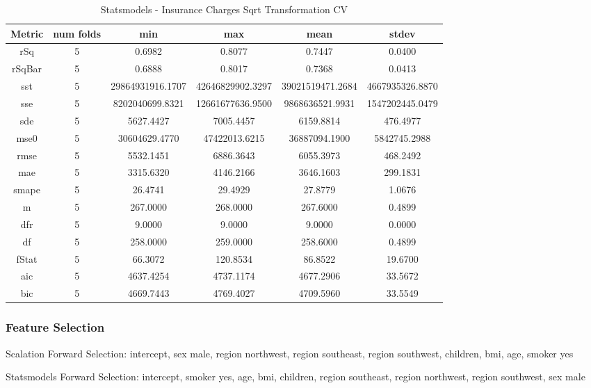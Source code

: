 \documentclass{article}
\begin{document}
\begin{table}[H]
\centering
\caption{Statsmodels - Insurance Charges Sqrt Transformation CV}
\label{tab:Statsmodels - Insurance Charges Sqrt Transformation CV}
\begin{tabular}{|c|c|c|c|c|c|}\hline
Metric & num folds & min & max & mean & stdev \\ \hline \hline
rSq & 5 & 0.6982 & 0.8077 & 0.7447 & 0.0400 \\ \hline
rSqBar & 5 & 0.6888 & 0.8017 & 0.7368 & 0.0413 \\ \hline
sst & 5 & 29864931916.1707 & 42646829902.3297 & 39021519471.2684 & 4667935326.8870 \\ \hline
sse & 5 & 8202040699.8321 & 12661677636.9500 & 9868636521.9931 & 1547202445.0479 \\ \hline
sde & 5 & 5627.4427 & 7005.4457 & 6159.8814 & 476.4977 \\ \hline
mse0 & 5 & 30604629.4770 & 47422013.6215 & 36887094.1900 & 5842745.2988 \\ \hline
rmse & 5 & 5532.1451 & 6886.3643 & 6055.3973 & 468.2492 \\ \hline
mae & 5 & 3315.6320 & 4146.2166 & 3646.1603 & 299.1831 \\ \hline
smape & 5 & 26.4741 & 29.4929 & 27.8779 & 1.0676 \\ \hline
m & 5 & 267.0000 & 268.0000 & 267.6000 & 0.4899 \\ \hline
dfr & 5 & 9.0000 & 9.0000 & 9.0000 & 0.0000 \\ \hline
df & 5 & 258.0000 & 259.0000 & 258.6000 & 0.4899 \\ \hline
fStat & 5 & 66.3072 & 120.8534 & 86.8522 & 19.6700 \\ \hline
aic & 5 & 4637.4254 & 4737.1174 & 4677.2906 & 33.5672 \\ \hline
bic & 5 & 4669.7443 & 4769.4027 & 4709.5960 & 33.5549 \\ \hline
\end{tabular}
\end{table}

\subsubsection{Feature Selection}

Scalation Forward Selection: intercept, sex male, region northwest, region southeast, region southwest, children, bmi, age, smoker yes

Statsmodels Forward Selection: intercept, smoker yes, age, bmi, children, region southeast, region northwest, region southwest, sex male
\end{document}
